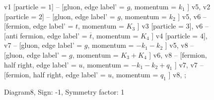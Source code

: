 \documentclass{revtex4}
\begin{document}
\begin{figure}[!htb]
\begin{center}
{    %
v1 [particle = \(1\)] -- [gluon, edge label' = \(g\), momentum = \(k_{1}\) ] v5, 
v2 [particle = \(2\)] -- [gluon, edge label' = \(g\), momentum = \(k_{2}\) ] v5, 
v6 -- [fermion, edge label' = \(t\), momentum = \(K_{3}\) ] v3 [particle = \(3\)], 
v6 -- [anti fermion, edge label' = \(\overline{t}\), momentum = \(K_{4}\) ] v4 [particle = \(4\)], 
v7 -- [gluon, edge label' = \(g\), momentum = \(-k_{1} - k_{2}\) ] v5, 
v8 -- [gluon, edge label' = \(g\), momentum = \(K_{3} + K_{4}\) ] v6, 
v8 -- [fermion, half right, edge label' = \(u\), momentum = \(-k_{1} - k_{2} + q_{1}\) ] v7, 
v7 -- [fermion, half right, edge label' = \(u\), momentum = \(q_{1}\) ] v8, 
};
\end{center}
\caption{Diagram8, Sign: -1, Symmetry factor: 1}
\end{figure}
\newpage
\end{document}
